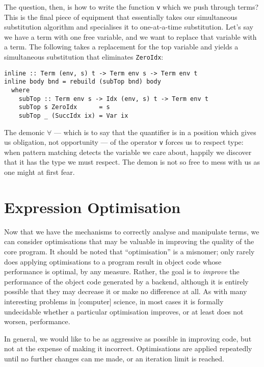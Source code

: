The question, then, is how to write the function \texttt{v} which we push
through terms? This is the final piece of equipment that essentially takes our
simultaneous substitution algorithm and specialises it to one-at-a-time
substitution. Let's say we have a term with one free variable, and we want to
replace that variable with a term. The following takes a replacement for the top
variable and yields a simultaneous substitution that eliminates
\texttt{ZeroIdx}:
%
\begin{lstlisting}[style=haskell,caption={A simultaneous substitution to inline terms}]
inline :: Term (env, s) t -> Term env s -> Term env t
inline body bnd = rebuild (subTop bnd) body
  where
    subTop :: Term env s -> Idx (env, s) t -> Term env t
    subTop s ZeroIdx      = s
    subTop _ (SuccIdx ix) = Var ix
\end{lstlisting}
%
The demonic $\forall$ --- which is to say that the quantifier is in a position
which gives us obligation, not opportunity --- of the operator \texttt{v} forces
us to respect type: when pattern matching detects the variable we care about,
happily we discover that it has the type we must respect. The demon is not so
free to mess with us as one might at first fear.



\section{Expression Optimisation}

Now that we have the mechanisms to correctly analyse and manipulate terms, we
can consider optimisations that may be valuable in improving the quality of the
core program. It should be noted that ``optimisation'' is a misnomer; only
rarely does applying optimisations to a program result in object code whose
performance is optimal, by any measure. Rather, the goal is to \emph{improve}
the performance of the object code generated by a backend, although it is
entirely possible that they may decrease it or make no difference at all. As
with many interesting problems in [computer] science, in most cases it is
formally undecidable whether a particular optimisation improves, or at least
does not worsen, performance.

In general, we would like to be as aggressive as possible in improving code, but
not at the expense of making it incorrect. Optimisations are applied repeatedly
until no further changes can me made, or an iteration limit is reached.


